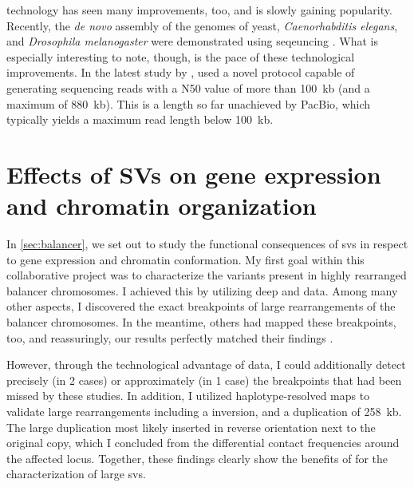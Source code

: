 \ont technology has seen many improvements, too, and is slowly gaining
popularity. Recently, the \textit{de novo} assembly of the genomes of yeast,
\textit{Caenorhabditis elegans}, and \textit{Drosophila melanogaster} were
demonstrated using \ont seqeuncing \citep{Istace2017,Tyson2017,Solares2018}.
What is especially interesting to note, though, is the pace of these technological
improvements. In the latest study by \ont, \citet{Jain2018} used a novel protocol
capable of generating sequencing reads with a N50 value of more than 100~kb
(and a maximum of 880~kb). This is a length so far unachieved by PacBio, which
typically yields a maximum read length below 100~kb.





\section{Effects of SVs on gene expression and chromatin organization}

In \cref{sec:balancer}, we set out to study the functional consequences of
\acp{sv} in respect to gene expression and chromatin conformation. My first goal
within this collaborative project was to characterize the variants present in
highly rearranged balancer chromosomes. I achieved this by utilizing deep \wgs
and \hic data. Among many other aspects, I discovered the exact breakpoints of
large rearrangements of the balancer chromosomes. In the meantime, others had
mapped these breakpoints, too, and reassuringly, our results perfectly matched
their findings \citep{Miller2016,Miller2018}.

However, through the technological
advantage of \hic data, I could additionally detect precisely (in 2
cases) or approximately (in 1 case) the breakpoints that had been missed by
these studies. In addition, I utilized haplotype-resolved \hic maps to validate
large rearrangements including a inversion, and a duplication of 258~kb. The
large duplication most likely inserted in reverse orientation next to the
original copy, which I concluded from the differential contact frequencies
around the affected locus. Together, these findings clearly show the benefits
of \hic for the characterization of large \acp{sv}.

